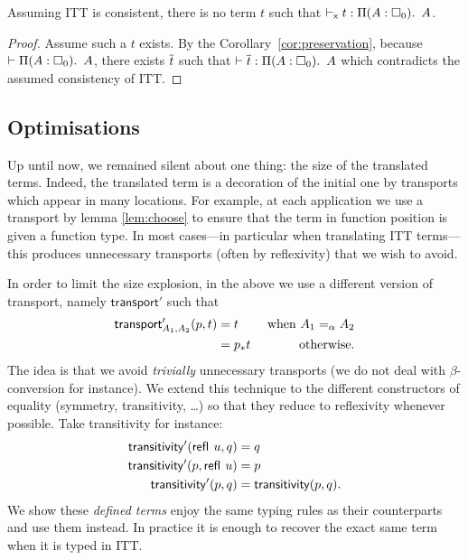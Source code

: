 \begin{corollary}
  \label{cor:consistency}
  Assuming ITT is consistent, there is no term $t$ such that
  $\vdash_{\mathsf{x}} t : \mathop{\Pi(A:\square_{0}).\ }{A}$.
\end{corollary}

\begin{proof}
  Assume such a $t$ exists. By the Corollary~\ref{cor:preservation},
  because $\vdash \mathop{\Pi(A:\square_{0}).\ }{A}$,
  there exists $\overline{t}$ such that $\vdash \overline{t} : \mathop{\Pi(A:\square_{0}).\ }{A}$ which
  contradicts the assumed consistency of ITT.
\end{proof}

\subsection{Optimisations}
\label{sec:optim}

Up until now, we remained silent about one thing: the size of the
translated terms. Indeed, the translated term is a decoration of the
initial one by transports which appear in many locations. For example,
at each application we use a transport by lemma \ref{lem:choose} to
ensure that the term in function position is given a function type. In
most cases---in particular when translating ITT terms---this produces
unnecessary transports (often by reflexivity) that we wish to avoid.

In order to limit the size explosion, in the above we use a different version of
transport, namely $\mathsf{transport}'$ such that
%
\begin{align*}
  \mathsf{transport}'_{A_1,A_2}(p,t) &= t &\text{ when } A_1 =_\alpha A_2 \\
  &= p_*{t} &\text{ otherwise.}
\end{align*}
%
The idea is that we avoid \emph{trivially} unnecessary transports (we do not
deal with $\beta$-conversion for instance).
We extend this technique to the different constructors of equality (symmetry,
transitivity, \dots) so that they reduce to reflexivity whenever possible.
Take transitivity for instance:
%
\begin{align*}
  \mathsf{transitivity}'({\mathsf{refl}}_{}\  u,q) &= q \\
  \mathsf{transitivity}'(p,{\mathsf{refl}}_{}\  u) &= p \\
  \mathsf{transitivity}'(p,q) &= \mathsf{transitivity}(p,q).
\end{align*}
%
We show these \emph{defined terms} enjoy the same typing rules as their
counterparts and use them instead.
In practice it is enough to recover the exact same term when it is typed in ITT.


